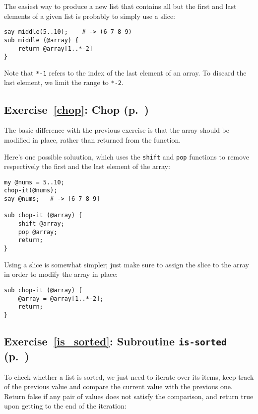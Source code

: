 The easiest way to produce a new list that contains 
all but the first and last elements of a given list 
is probably to simply use a slice:

\begin{verbatim}
say middle(5..10);    # -> (6 7 8 9)
sub middle (@array) { 
    return @array[1..*-2] 
}
\end{verbatim}

Note that \verb'*-1' refers to the index of the last element 
of an array. To discard the last element, we limit the 
range to \verb'*-2'.

\subsection{Exercise~\ref{chop}: Chop (p.~\pageref{chop})}
\label{sol_chop}

The basic difference with the previous exercise is that 
the array should be modified in place, rather than 
returned from the function.

Here's one possible soluution, which uses the 
{\tt shift} and {\tt pop} functions to remove 
respectively the first and the last element of 
the array:

\begin{verbatim}
my @nums = 5..10;
chop-it(@nums); 
say @nums;   # -> [6 7 8 9]

sub chop-it (@array) { 
    shift @array; 
    pop @array; 
    return;
}
\end{verbatim}

Using a slice is somewhat simpler; just make sure to 
assign the slice to the array in order to modify the 
array in place:

\begin{verbatim}
sub chop-it (@array) { 
    @array = @array[1..*-2];
    return;
}
\end{verbatim}
%

\subsection{Exercise~\ref{is_sorted}: Subroutine {\tt is-sorted} (p.~\pageref{is_sorted})}
\label{sol_is_sorted}

To check whether a list is sorted, we just need to iterate 
over its items, keep track of the previous value and compare 
the current value with the previous one. Return false if 
any pair of values does not satisfy the comparison, and 
return true upon getting to the end of the iteration:

